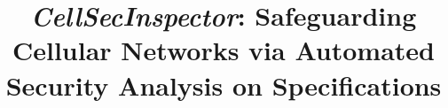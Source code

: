 \documentclass[sigconf]{acmart}
\newcommand{\lm}{\textit{CellSecInspector}\xspace}
\begin{document}
\title{\lm: Safeguarding Cellular Networks via Automated Security Analysis on Specifications}









\end{document}
